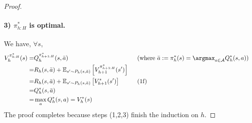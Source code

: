 \begin{proof}
\paragraph{3) $\pi^*_{h:H}$ is optimal.}
We have, $\forall s$,
\begin{align*}
V_h^{\pi_{h:H}^*}(s)
=& Q_h^{\pi^*_{h+1: H}}(s, \bar{a}) \qquad &&\text {(where $ \bar{a}:=\pi_h^*(s)=\argmax_{a\in\mathcal{A}} Q_h^*(s, a)$)} \\
=& R_h(s, \bar{a})+\mathbb{E}_{s' \sim P_h(s, \bar{a})}\left[V_{h+1}^{\pi_{h+1: H}^*}(s')\right]\\
=& R_h(s, \bar{a})+\mathbb{E}_{s' \sim P_h(s, \bar{a})}\left[V_{h+1}^{*}(s')\right] \qquad&&\text{(1f)}\\
= &Q_h^*(s, \bar{a}) \\
= &\max_a Q_h^*(s, a) = V^*_h(s)
\end{align*}
The proof completes because steps (1,2,3) finish the induction on $h$.
\end{proof}
